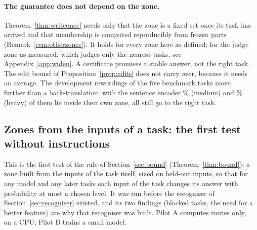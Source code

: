 \paragraph{The guarantee does not depend on the zone.} Theorem~\ref{thm:writeonce} needs only that the zone is a fixed set once its task has arrived and that membership is computed reproducibly from frozen parts (Remark~\ref{rem:otherzones}). It holds for every zone here as defined; for the judge zone as measured, which judges only the \WidenJudgeLimit{} nearest tasks, see Appendix~\ref{app:widen}. A certificate promises a stable answer, not the right task. The edit bound of Proposition~\ref{prop:edits} does not carry over, because it needs an average. The development rewordings of the five benchmark tasks move further than a back-translation: with the sentence encoder \WidenEncBenchMediumZone{}\% (medium) and \WidenEncBenchHeavyZone{}\% (heavy) of them lie inside their own zone, all still go to the right task.

\subsection{Zones from the inputs of a task: the first test without instructions}
\label{sec:noinstruction}

This is the first test of the rule of Section~\ref{sec:bound} (Theorem~\ref{thm:bound}): a zone built from the inputs of the task itself, sized on held-out inputs, so that for any model and any later tasks each input of the task changes its answer with probability at most a chosen level. It was run before the recogniser of Section~\ref{sec:recogniser} existed, and its two findings (blocked tasks, the need for a better feature) are why that recogniser was built. Pilot A computes routes only, on a CPU; Pilot B trains a small model.

